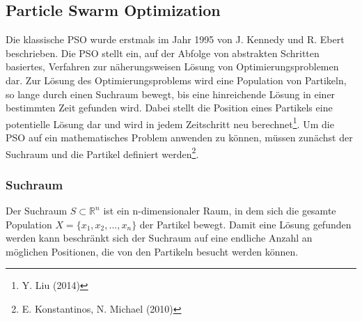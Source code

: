 \documentclass[a4paper, 11pt]{article}
\begin{document}
\subsection{Particle Swarm Optimization}
Die klassische \ac{PSO} wurde erstmals im Jahr 1995 von J. Kennedy und R. Ebert beschrieben. Die \acs{PSO} stellt ein, auf der Abfolge von abstrakten Schritten basiertes, Verfahren zur näherungsweisen Lösung von Optimierungsproblemen dar. Zur Lösung des Optimierungsproblems wird eine Population von Partikeln, so lange durch einen Suchraum bewegt, bis eine hinreichende Lösung in einer bestimmten Zeit gefunden wird. Dabei stellt die Position eines Partikels eine potentielle Lösung dar und wird in jedem Zeitschritt neu berechnet\footnote{Y. Liu (2014)}. Um die \acs{PSO} auf ein mathematisches Problem anwenden zu können, müssen zunächst der Suchraum und die Partikel definiert werden\footnote{E. Konstantinos, N. Michael (2010)}.
\subsubsection{Suchraum}
Der Suchraum $S \subset \mathbb{R}^n$ ist ein n-dimensionaler Raum, in dem sich die gesamte Population $X=\{x_{1},x_{2},...,x_{n}\}$ der Partikel bewegt. Damit eine Lösung gefunden werden kann beschränkt sich der Suchraum auf eine endliche Anzahl an möglichen Positionen, die von den Partikeln besucht werden können.
\end{document}
